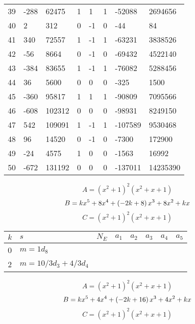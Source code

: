 \documentclass{amsart}
\begin{document}
\begin{longtable}{|l|l|l|lllll|}
39&-288&62475&1&1&1&-52088&2694656\\
40&2&312&0&-1&0&-44&84\\
41&340&72557&1&-1&1&-63231&3838526\\
42&-56&8664&0&-1&0&-69432&4522140\\
43&-384&83655&1&-1&1&-76082&5288456\\
44&36&5600&0&0&0&-325&1500\\
45&-360&95817&1&1&1&-90809&7095566\\
46&-608&102312&0&0&0&-98931&8249150\\
47&542&109091&1&-1&1&-107589&9530468\\
48&96&14520&0&-1&0&-7300&172900\\
49&-24&4575&1&0&0&-1563&16992\\
50&-672&131192&0&0&0&-137011&14235390\\
\hline
\end{longtable}
$$A=(x^2
 + 1)^{2}(x^2
 + x
 + 1)$$
$$B=k\*x^5
 + 8\*x^4
 + \left(-2\*k
 + 8\right) \*x^3
 + 8\*x^2
 + k\*x$$
$$C=(x^2
 + 1)^{2}(x^2
 + x
 + 1)$$
\begin{longtable}{|l|l|l|lllll|}
\hline
$k$ & $s$ & $N_E$ & $a_1$ & $a_2$ & $a_3$ & $a_4$ & $a_5$\\
\hline
0&$m=1d_{8}$&&\multicolumn{5}{c|}{}\\
2&$m=10/3d_{3}+4/3d_{4}$&&\multicolumn{5}{c|}{}\\
\hline
\end{longtable}
$$A=(x^2
 + 1)^{2}(x^2
 + x
 + 1)$$
$$B=k\*x^5
 + 4\*x^4
 + \left(-2\*k
 + 16\right) \*x^3
 + 4\*x^2
 + k\*x$$
$$C=(x^2
 + 1)^{2}(x^2
 + x
 + 1)$$
\end{document}

